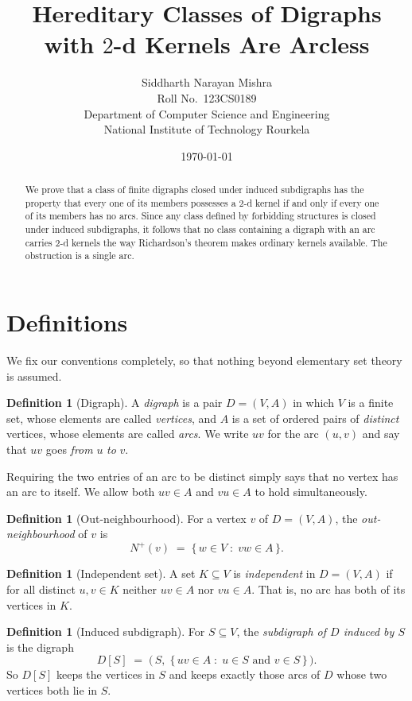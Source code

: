\documentclass[11pt]{article}
\title{Hereditary Classes of Digraphs with $2$-d Kernels Are Arcless}
\author{%
  Siddharth Narayan Mishra\\[0.2em]
  \small Roll No.\ 123CS0189\\
  \small Department of Computer Science and Engineering\\
  \small National Institute of Technology Rourkela%
}
\date{\today}
\theoremstyle{plain}
\theoremstyle{definition}
\newtheorem{definition}[theorem]{Definition}
\theoremstyle{remark}
\newcommand{\Nout}{N^{+}}
\begin{document}
\maketitle

\begin{abstract}
\noindent
We prove that a class of finite digraphs closed under induced subdigraphs has the property
that every one of its members possesses a $2$-d kernel if and only if every one of its
members has no arcs. Since any class defined by forbidding structures is closed under induced
subdigraphs, it follows that no class containing a digraph with an arc carries $2$-d kernels the way
Richardson's theorem makes ordinary kernels available. The obstruction is a single arc.
\end{abstract}

\section{Definitions}

We fix our conventions completely, so that nothing beyond elementary set theory is assumed.

\begin{definition}[Digraph]
A \emph{digraph} is a pair $D = (V, A)$ in which $V$ is a finite set, whose elements are
called \emph{vertices}, and $A$ is a set of ordered pairs of \emph{distinct} vertices, whose
elements are called \emph{arcs}. We write $uv$ for the arc $(u,v)$ and say that $uv$ goes
\emph{from} $u$ \emph{to} $v$.
\end{definition}

Requiring the two entries of an arc to be distinct simply says that no vertex has an arc to
itself. We allow both $uv \in A$ and $vu \in A$ to hold simultaneously.

\begin{definition}[Out-neighbourhood]
For a vertex $v$ of $D = (V,A)$, the \emph{out-neighbourhood} of $v$ is
\[
  \Nout(v) \;=\; \{\, w \in V \;:\; vw \in A \,\}.
\]
\end{definition}

\begin{definition}[Independent set]
A set $K \subseteq V$ is \emph{independent} in $D = (V,A)$ if for all distinct $u, v \in K$
neither $uv \in A$ nor $vu \in A$. That is, no arc has both of its vertices in $K$.
\end{definition}

\begin{definition}[Induced subdigraph]
For $S \subseteq V$, the \emph{subdigraph of $D$ induced by $S$} is the digraph
\[
  D[S] \;=\; \bigl(\, S,\; \{\, uv \in A \;:\; u \in S \text{ and } v \in S \,\} \,\bigr).
\]
So $D[S]$ keeps the vertices in $S$ and keeps exactly those arcs of $D$ whose two vertices
both lie in $S$.
\end{definition}
\end{document}
